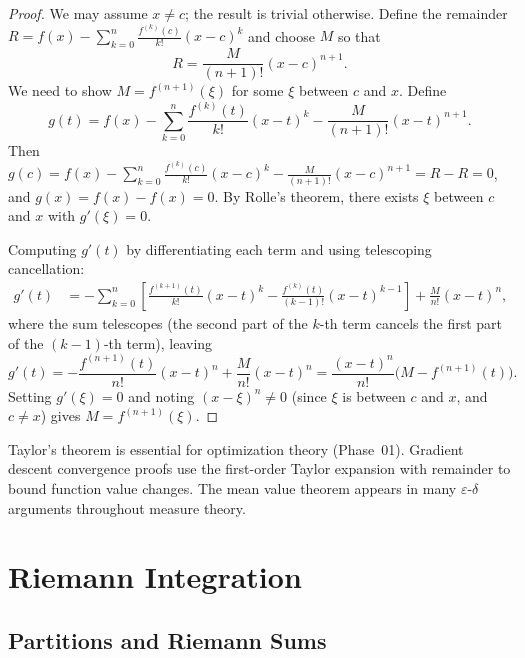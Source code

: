 \documentclass[11pt,a4paper]{article}
\theoremstyle{definition}
\theoremstyle{plain}
\theoremstyle{remark}
\begin{document}
\begin{proof}
We may assume $x \neq c$; the result is trivial otherwise. Define the remainder
$R = f(x) - \sum_{k=0}^{n} \frac{f^{(k)}(c)}{k!}(x-c)^k$ and choose $M$ so that
\[
R = \frac{M}{(n+1)!}(x - c)^{n+1}.
\]
We need to show $M = f^{(n+1)}(\xi)$ for some $\xi$ between $c$ and $x$. Define
\[
g(t) = f(x) - \sum_{k=0}^{n} \frac{f^{(k)}(t)}{k!}(x - t)^k
- \frac{M}{(n+1)!}(x - t)^{n+1}.
\]
Then $g(c) = f(x) - \sum_{k=0}^n \frac{f^{(k)}(c)}{k!}(x-c)^k -
\frac{M}{(n+1)!}(x-c)^{n+1} = R - R = 0$, and $g(x) = f(x) - f(x) = 0$.
By Rolle's theorem, there exists $\xi$ between $c$ and $x$ with $g'(\xi) = 0$.

Computing $g'(t)$ by differentiating each term and using telescoping cancellation:
\begin{align*}
g'(t) &= -\sum_{k=0}^{n} \left[\frac{f^{(k+1)}(t)}{k!}(x-t)^k
- \frac{f^{(k)}(t)}{(k-1)!}(x-t)^{k-1}\right]
+ \frac{M}{n!}(x-t)^n,
\end{align*}
where the sum telescopes (the second part of the $k$-th term cancels the first
part of the $(k-1)$-th term), leaving
\[
g'(t) = -\frac{f^{(n+1)}(t)}{n!}(x - t)^n + \frac{M}{n!}(x-t)^n
= \frac{(x-t)^n}{n!}\bigl(M - f^{(n+1)}(t)\bigr).
\]
Setting $g'(\xi) = 0$ and noting $(x - \xi)^n \neq 0$ (since $\xi$ is between
$c$ and $x$, and $c \neq x$) gives $M = f^{(n+1)}(\xi)$.
\end{proof}

\begin{rlconnection}
Taylor's theorem is essential for optimization theory (Phase~01). Gradient descent
convergence proofs use the first-order Taylor expansion with remainder to bound
function value changes. The mean value theorem appears in many
$\varepsilon$-$\delta$ arguments throughout measure theory.
\end{rlconnection}

\section{Riemann Integration}
\label{sec:riemann}

\subsection{Partitions and Riemann Sums}
\label{subsec:partitions}
\end{document}
